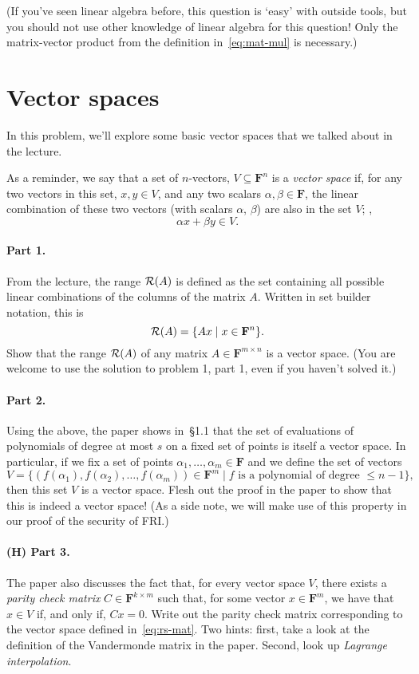 \documentclass[12pt]{article}
\newcommand{\field}{\mathbf{F}}
\begin{document}
(If you've seen linear algebra before, this question is `easy' with outside
tools, but you should not use other knowledge of linear algebra for this
question! Only the matrix-vector product from the definition
in~\eqref{eq:mat-mul} is necessary.)

\section{Vector spaces}
In this problem, we'll explore some basic vector spaces that we talked about in the
lecture.

As a reminder, we say that a set of $n$-vectors, $V \subseteq \field^n$ is a
\emph{vector space} if, for any two vectors in this set, $x, y \in V$, and any
two scalars $\alpha, \beta \in \field$, the linear combination of these two
vectors (with scalars $\alpha$, $\beta$) are also in the set $V$; \ie,
\[
    \alpha x + \beta y \in V.
\]

\paragraph{Part 1.} From the lecture, the range ${\mathcal R}(A)$
is defined as the set containing all possible linear combinations of the
columns of the matrix $A$. Written in set builder notation, this is
\[
    \range(A) = \{Ax \mid x \in \field^n\}.
\]
Show that the range ${\mathcal R}(A)$ of any matrix $A \in \field^{m\times n}$ is a
vector space. (You are welcome to use the solution to problem 1, part 1, even
if you haven't solved it.)

\paragraph{Part 2.} Using the above, the paper shows in~\S1.1 that the set of
evaluations of polynomials of degree at most $s$ on a fixed set of points is
itself a vector space. In particular, if we fix a set of points $\alpha_1,
\dots, \alpha_m \in \field$ and we define the set of vectors
\begin{equation}\label{eq:rs-mat}
    V = \{(f(\alpha_1), f(\alpha_2), \dots, f(\alpha_m)) \in \field^m \mid \text{$f$ is a polynomial of degree $\le n-1$}\},
\end{equation}
then this set $V$ is a vector space. Flesh out the proof in the paper to show
that this is indeed a vector space! (As a side note, we will make use of this
property in our proof of the security of FRI.)

\paragraph{(H) Part 3.} The paper also discusses the fact that, for every
vector space $V$, there exists a \emph{parity check matrix} $C \in
\field^{k\times m}$ such that, for some vector $x \in \field^m$, we have that
$x \in V$ if, and only if, $Cx = 0$. Write out the parity check matrix
corresponding to the vector space defined in~\eqref{eq:rs-mat}.
Two hints: first, take a look at the definition of the Vandermonde matrix
in the paper. Second, look up \emph{Lagrange interpolation}.
\end{document}
